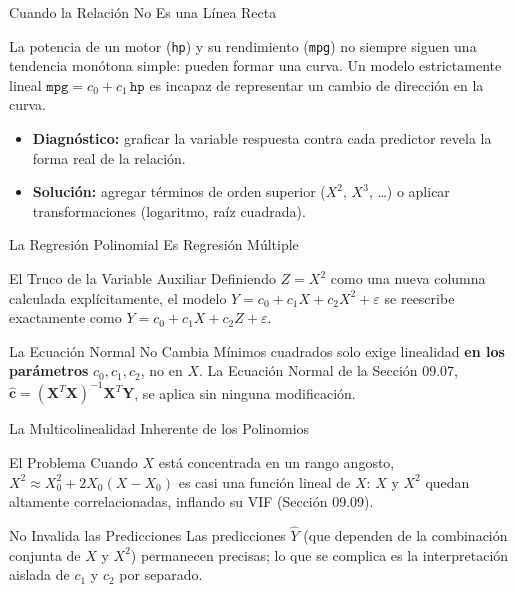 \documentclass[10pt, aspectratio=169]{beamer}
\begin{document}
\begin{frame}{Cuando la Relación No Es una Línea Recta}
  \footnotesize
  \begin{motivacion}
    La potencia de un motor (\texttt{hp}) y su rendimiento (\texttt{mpg}) no siempre siguen una tendencia monótona simple: pueden formar una curva. Un modelo estrictamente lineal $\texttt{mpg}=c_0+c_1\,\texttt{hp}$ es incapaz de representar un cambio de dirección en la curva.
  \end{motivacion}

  \vspace{0.15cm}
  \pause
  \begin{itemize}\itemsep=0.1cm
    \item \textbf{Diagnóstico:} graficar la variable respuesta contra cada predictor revela la forma real de la relación. \pause
    \item \textbf{Solución:} agregar términos de orden superior ($X^2$, $X^3$, \ldots) o aplicar transformaciones (logaritmo, raíz cuadrada).
  \end{itemize}
\end{frame}

\begin{frame}{La Regresión Polinomial Es Regresión Múltiple}
  \footnotesize
  \begin{block}{El Truco de la Variable Auxiliar}
    Definiendo $Z=X^2$ como una nueva columna calculada explícitamente, el modelo $Y=c_0+c_1X+c_2X^2+\varepsilon$ se reescribe exactamente como $Y=c_0+c_1X+c_2Z+\varepsilon$.
  \end{block}
  \pause

  \vspace{0.1cm}
  \begin{alertblock}{La Ecuación Normal No Cambia}
    Mínimos cuadrados solo exige linealidad \textbf{en los parámetros} $c_0,c_1,c_2$, no en $X$. La Ecuación Normal de la Sección 09.07, $\hat{\mathbf{c}}=(\mathbf{X}^T\mathbf{X})^{-1}\mathbf{X}^T\mathbf{Y}$, se aplica sin ninguna modificación.
  \end{alertblock}
\end{frame}

\begin{frame}{La Multicolinealidad Inherente de los Polinomios}
  \footnotesize
  \begin{block}{El Problema}
    Cuando $X$ está concentrada en un rango angosto, $X^2\approx X_0^2+2X_0(X-X_0)$ es casi una función lineal de $X$: $X$ y $X^2$ quedan altamente correlacionadas, inflando su VIF (Sección 09.09).
  \end{block}
  \pause

  \vspace{0.1cm}
  \begin{alertblock}{No Invalida las Predicciones}
    Las predicciones $\hat Y$ (que dependen de la combinación conjunta de $X$ y $X^2$) permanecen precisas; lo que se complica es la interpretación aislada de $c_1$ y $c_2$ por separado.
  \end{alertblock}
\end{frame}
\end{document}

